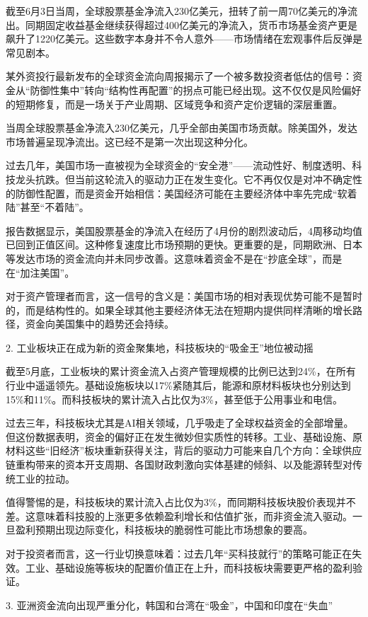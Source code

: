 \documentclass[11pt]{ctexart}
\begin{document}
截至6月3日当周，全球股票基金净流入230亿美元，扭转了前一周70亿美元的净流出。同期固定收益基金继续获得超过400亿美元的净流入，货币市场基金资产更是飙升了1220亿美元。这些数字本身并不令人意外——市场情绪在宏观事件后反弹是常见剧本。

某外资投行最新发布的全球资金流向周报揭示了一个被多数投资者低估的信号：资金从“防御性集中”转向“结构性再配置”的拐点可能已经出现。这不仅仅是风险偏好的短期修复，而是一场关于产业周期、区域竞争和资产定价逻辑的深层重置。

当周全球股票基金净流入230亿美元，几乎全部由美国市场贡献。除美国外，发达市场普遍呈现净流出。这已经不是第一次出现这种分化。

过去几年，美国市场一直被视为全球资金的“安全港”——流动性好、制度透明、科技龙头抗跌。但当前这轮流入的驱动力正在发生变化。它不再仅仅是对冲不确定性的防御性配置，而是资金开始相信：美国经济可能在主要经济体中率先完成“软着陆”甚至“不着陆”。

报告数据显示，美国股票基金的净流入在经历了4月份的剧烈波动后，4周移动均值已回到正值区间。这种修复速度比市场预期的更快。更重要的是，同期欧洲、日本等发达市场的资金流向并未同步改善。这意味着资金不是在“抄底全球”，而是在“加注美国”。

对于资产管理者而言，这一信号的含义是：美国市场的相对表现优势可能不是暂时的，而是结构性的。如果全球其他主要经济体无法在短期内提供同样清晰的增长路径，资金向美国集中的趋势还会持续。

2. 工业板块正在成为新的资金聚集地，科技板块的“吸金王”地位被动摇

截至5月底，工业板块的累计资金流入占资产管理规模的比例已达到24\%，在所有行业中遥遥领先。基础设施板块以17\%紧随其后，能源和原材料板块也分别达到15\%和11\%。而科技板块的累计流入占比仅为3\%，甚至低于公用事业和电信。

过去三年，科技板块尤其是AI相关领域，几乎吸走了全球权益资金的全部增量。但这份数据表明，资金的偏好正在发生微妙但实质性的转移。工业、基础设施、原材料这些“旧经济”板块重新获得关注，背后的驱动力可能来自几个方向：全球供应链重构带来的资本开支周期、各国财政刺激向实体基建的倾斜、以及能源转型对传统工业的拉动。

值得警惕的是，科技板块的累计流入占比仅为3\%，而同期科技板块股价表现并不差。这意味着科技股的上涨更多依赖盈利增长和估值扩张，而非资金流入驱动。一旦盈利预期出现边际变化，科技板块的脆弱性可能比市场想象的要高。

对于投资者而言，这一行业切换意味着：过去几年“买科技就行”的策略可能正在失效。工业、基础设施等板块的配置价值正在上升，而科技板块需要更严格的盈利验证。

3. 亚洲资金流向出现严重分化，韩国和台湾在“吸金”，中国和印度在“失血”
\end{document}
